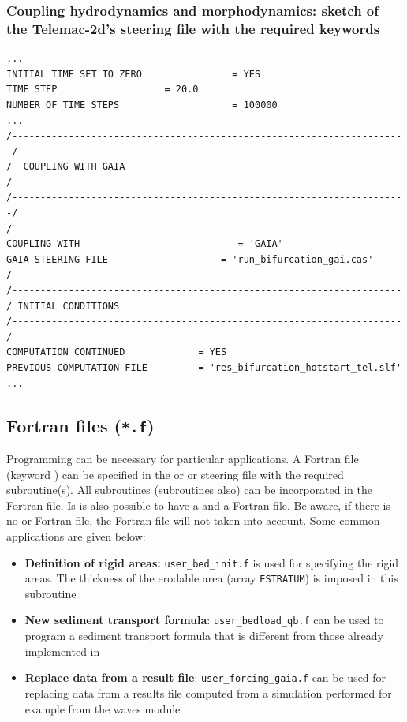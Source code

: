 \subsubsection{Coupling hydrodynamics and morphodynamics: sketch of the Telemac-2d's steering file with the required keywords}
\lstset{language=TelemacCas,
        basicstyle=\scriptsize\ttfamily}
\begin{lstlisting}[frame=trBL]
...
INITIAL TIME SET TO ZERO                = YES
TIME STEP			        = 20.0
NUMBER OF TIME STEPS                    = 100000
...
/----------------------------------------------------------------------/
/  COUPLING WITH GAIA                                                  /
/----------------------------------------------------------------------/
/
COUPLING WITH                            = 'GAIA'
GAIA STEERING FILE                    = 'run_bifurcation_gai.cas'
/
/---------------------------------------------------------------------
/ INITIAL CONDITIONS
/---------------------------------------------------------------------
/
COMPUTATION CONTINUED             = YES
PREVIOUS COMPUTATION FILE         = 'res_bifurcation_hotstart_tel.slf'
...
\end{lstlisting}
\subsection{Fortran files (\texttt{*.f})}
Programming can be necessary for particular applications. A Fortran file (keyword ) can be specified in the  or  or \gaia steering file with the required subroutine(s). All subroutines (\gaia subroutines also) can be incorporated in the \telemac{} Fortran file. Is is also possible to have a \telemac and a \gaia Fortran file. Be aware, if there is no  or  Fortran file, the \gaia Fortran file will not taken into account.
Some common applications are given below:
\begin{itemize}
\item \textbf{Definition of rigid areas:} \texttt{user\_bed\_init.f} is used for specifying the rigid areas. The thickness of the erodable area (array \texttt{ESTRATUM}) is imposed in this subroutine

\item \textbf{New sediment transport formula}: \texttt{user\_bedload\_qb.f} can be used to program a sediment transport formula that is different from those already implemented in \gaia{}

\item \textbf{Replace data from a result file}: \texttt{user\_forcing\_gaia.f} can be used for replacing data from a results file computed from a simulation performed for example from the waves module \tomawac{}

\end{itemize}

